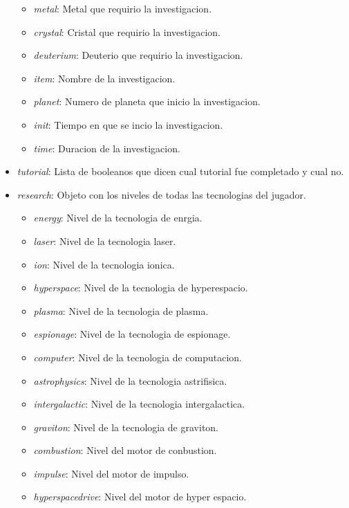 \documentclass{article}
\begin{document}
\begin{itemize}[noitemsep]
    \begin{itemize}[noitemsep]
        \item \textit{metal}: Metal que requirio la investigacion.
        \item \textit{crystal}: Cristal que requirio la investigacion.
        \item \textit{deuterium}: Deuterio que requirio la investigacion.
        \item \textit{item}: Nombre de la investigacion.
        \item \textit{planet}: Numero de planeta que inicio la investigacion.
        \item \textit{init}: Tiempo en que se incio la investigacion.
        \item \textit{time}: Duracion de la investigacion.
    \end{itemize}
    \item \textit{tutorial}: Lista de booleanos que dicen cual tutorial fue completado y cual no.
    \item \textit{research}: Objeto con los niveles de todas las tecnologias del jugador.
    \begin{itemize}[noitemsep]
        \item \textit{energy}: Nivel de la tecnologia de enrgia.
        \item \textit{laser}: Nivel de la tecnologia laser.
        \item \textit{ion}: Nivel de la tecnologia ionica.
        \item \textit{hyperspace}: Nivel de la tecnologia de hyperespacio.
        \item \textit{plasma}: Nivel de la tecnologia de plasma.
        \item \textit{espionage}: Nivel de la tecnologia de espionage.
        \item \textit{computer}: Nivel de la tecnologia de computacion.
        \item \textit{astrophysics}: Nivel de la tecnologia astrifisica.
        \item \textit{intergalactic}: Nivel de la tecnologia intergalactica.
        \item \textit{graviton}: Nivel de la tecnologia de graviton.
        \item \textit{combustion}: Nivel del motor de conbustion.
        \item \textit{impulse}: Nivel del motor de impulso.
        \item \textit{hyperspacedrive}: Nivel del motor de hyper espacio.

\end{itemize}
\end{itemize}
\end{document}
